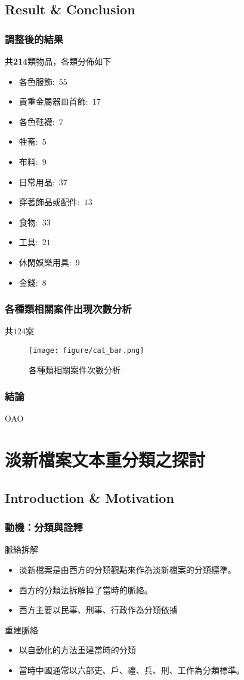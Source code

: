 \documentclass{beamer}
\begin{document}
\subsection{Result \& Conclusion}
\begin{frame}
    \frametitle{調整後的結果}
    共\textbf{214}類物品，各類分佈如下
        \begin{itemize}
        \item 各色服飾:~$55$
        \item 貴重金屬器皿首飾:~$17$
        \item 各色鞋襪:~$7$
        \item 牲畜:~$5$
        \item 布料:~$9$
        \item 日常用品:~$37$
        \item 穿著飾品或配件:~$13$
        \item 食物:~$33$
        \item 工具:~$21$
        \item 休閑娛樂用具:~$9$
        \item 金錢:~$8$
        \end{itemize}
\end{frame}

\begin{frame}
\frametitle{各種類相關案件出現次數分析}
共$124$案
\begin{figure}[H]
    	\begin{center}
        	\texttt{[image: figure/cat\_bar.png]}
			\caption{各種類相關案件次數分析}
    	\end{center}
	\end{figure}
\end{frame}
\begin{frame}
\frametitle{結論}
OAO
\end{frame}

\section{淡新檔案文本重分類之探討}
\subsection{Introduction \& Motivation}
\begin{frame}
	\frametitle{動機：分類與詮釋}
	脈絡拆解
	\begin{itemize}
	\item 淡新檔案是由西方的分類觀點來作為淡新檔案的分類標準。
	\item 西方的分類法拆解掉了當時的脈絡。
	\item 西方主要以民事、刑事、行政作為分類依據
	\end{itemize}
	重建脈絡
	\begin{itemize}
	\item 以自動化的方法重建當時的分類
	\item 當時中國通常以六部吏、戶、禮、兵、刑、工作為分類標準。
	\end{itemize}
\end{frame}
\end{document}
